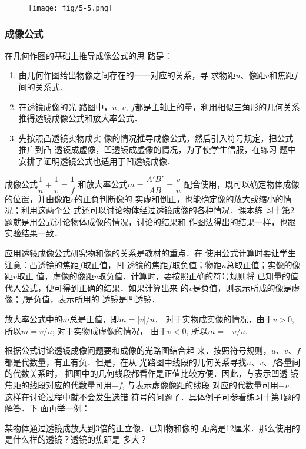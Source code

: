 \begin{figure}[htp]
    \centering
    \texttt{[image: fig/5-5.png]}
    \caption{}
\end{figure}

\subsubsection{成像公式}

在几何作图的基础上推导成像公式的思
路是：
\begin{enumerate}
\item 由几何作图给出物像之间存在的一一对应的关系，寻
求物距$u$、像距$v$和焦距$f$间的关系式．
\item 在透镜成像的光
路图中，$u$, $v$, $f$都是主轴上的量，利用相似三角形的几何关系
推得透镜成像公式和放大率公式．
\item 先按照凸透镜实物成实
像的情况推导成像公式，然后引入符号规定，把公式推广到凸
透镜成虚像，凹透镜成虚像的情况，为了使学生信服，在练习
题中安排了证明透镜公式也适用于凹透镜成像．
\end{enumerate}

成像公式$\dfrac{1}{u}+\dfrac{1}{v}=\dfrac{1}{f}$
和放大率公式$m=\dfrac{A'B'}{AB}=\dfrac{v}{u}$
配合使用，既可以确定物体成像的位置，并由像距$v$的正负判断像的
实虚和倒正，也能确定像的放大或缩小的情况；利用这两个公
式还可以讨论物体经过透镜成像的各种情况．课本练
习十第2题就是用公式讨论物体成像的情况，讨论的结果和
作图法得出的结果一样，也跟实验结果一致．

应用透镜成像公式研究物和像的关系是教材的重点．在
使用公式计算时要让学生注意：凸透镜的焦距$f$取正值，凹
透镜的焦距$f$取负值；物距$u$总取正值；实像的像距$v$取正
值，虚像的像距$v$取负值．计算时，要按照正确的符号规则将
已知量的值代入公式，便可得到正确的结果．如果计算出来
的$v$是负值，则表示所成的像是虚像；$f$是负值，表示所用的
透镜是凹透镜．

放大率公式中的$m$总是正值，即$m=|v|/u$．
对于实物成实像的情况，由于$v>0$, 所以$m=v/u$; 对于实物成虚像的情况，
由于$v<0$, 所以$m=-v/u$. 

根据公式讨论透镜成像问题要和成像的光路图结合起
来．按照符号规则，$u$、$v$、$f$都是代数量，有正有负．但是，在从
光路图中线段的几何关系寻找$u$、$v$、$f$各量间的代数关系时，
把图中的几何线段都看作是正值比较方便．因此，与表示凹透
镜焦距的线段对应的代数量可用$-f$, 与表示虚像像距的线段
对应的代数量可用$-v$. 这样在讨论过程中就不会发生选错
符号的问题了．具体例子可参看练习十第1题的解答．下
面再举一例：

某物体通过透镜成放大到3倍的正立像．已知物和像的
距离是12厘米．那么使用的是什么样的透镜？透镜的焦距是
多大？

